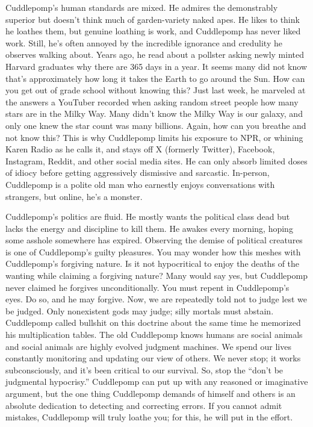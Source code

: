 Cuddlepomp's human standards are mixed. He admires the demonstrably
superior but doesn't think much of garden-variety naked apes. He likes
to think he loathes them, but genuine loathing is work, and Cuddlepomp
has never liked work. Still, he's often annoyed by the incredible
ignorance and credulity he observes walking about. Years ago, he read
about a pollster asking newly minted Harvard graduates why there are 365
days in a year. It seems many did not know that's approximately how long
it takes the Earth to go around the Sun. How can you get out of grade
school without knowing this? Just last week, he marveled at the answers
a YouTuber recorded when asking random street people how many stars are
in the Milky Way. Many didn't know the Milky Way is our galaxy, and only
one knew the star count was many billions. Again, how can you breathe
and not know this? This is why Cuddlepomp limits his exposure to NPR, or
whining Karen Radio as he calls it, and stays off X (formerly Twitter),
Facebook, Instagram, Reddit, and other social media sites. He can only
absorb limited doses of idiocy before getting aggressively dismissive
and sarcastic. In-person, Cuddlepomp is a polite old man who earnestly
enjoys conversations with strangers, but online, he's a monster.

Cuddlepomp's politics are fluid. He mostly wants the political class
dead but lacks the energy and discipline to kill them. He awakes every
morning, hoping some asshole somewhere has expired. Observing the demise
of political creatures is one of Cuddlepomp's guilty pleasures. You may
wonder how this meshes with Cuddlepomp's forgiving nature. Is it not
hypocritical to enjoy the deaths of the wanting while claiming a
forgiving nature? Many would say yes, but Cuddlepomp never claimed he
forgives unconditionally. You must repent in Cuddlepomp's eyes. Do so,
and he may forgive. Now, we are repeatedly told not to judge lest we be
judged. Only nonexistent gods may judge; silly mortals must abstain.
Cuddlepomp called bullshit on this doctrine about the same time he
memorized his multiplication tables. The old Cuddlepomp knows humans are
social animals and social animals are highly evolved judgment machines.
We spend our lives constantly monitoring and updating our view of
others. We never stop; it works subconsciously, and it's been critical
to our survival. So, stop the ``don't be judgmental hypocrisy.''
Cuddlepomp can put up with any reasoned or imaginative argument, but the
one thing Cuddlepomp demands of himself and others is an absolute
dedication to detecting and correcting errors. If you cannot admit
mistakes, Cuddlepomp will truly loathe you; for this, he will put in the
effort.

